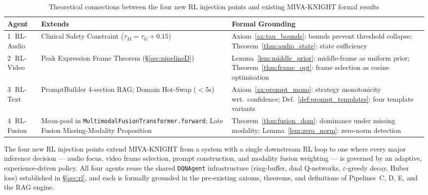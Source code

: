 \documentclass[12pt,a4paper]{article}
\theoremstyle{definition}
\theoremstyle{plain}
\theoremstyle{remark}
\begin{document}
\begin{table}[H]
\centering
\caption{Theoretical connections between the four new RL injection points and
existing MIVA-KNIGHT formal results}
\label{tab:rl_theory}
\begin{tabularx}{\textwidth}{lXX}
\toprule
\textbf{Agent} & \textbf{Extends} & \textbf{Formal Grounding} \\
\midrule
\textcircled{1} RL-Audio &
  Clinical Safety Constraint ($\tau_M = \tau_G + 0.15$) &
  Axiom~\ref{ax:tau_bounds}: bounds prevent threshold collapse;
  Theorem~\ref{thm:audio_state}: state sufficiency \\
\textcircled{2} RL-Video &
  Peak Expression Frame Theorem (\S\ref{sec:pipelineD}) &
  Lemma~\ref{lem:middle_prior}: middle-frame as uniform prior;
  Theorem~\ref{thm:frame_opt}: frame selection as cosine optimisation \\
\textcircled{3} RL-Text &
  PromptBuilder 4-section RAG; Domain Hot-Swap ($<$5s) &
  Axiom~\ref{ax:prompt_mono}: strategy monotonicity wrt.\ confidence;
  Def.~\ref{def:prompt_templates}: four template variants \\
\textcircled{4} RL-Fusion &
  Mean-pool in \texttt{MultimodalFusionTransformer.forward};
  Late Fusion Missing-Modality Proposition &
  Theorem~\ref{thm:fusion_dom}: dominance under missing modality;
  Lemma~\ref{lem:zero_norm}: zero-norm detection \\
\bottomrule
\end{tabularx}
\end{table}

\begin{tcolorbox}[keybox,title={Updated Conclusion Item 8 --- Four Modality-Wide RL Policies}]
The four new RL injection points extend MIVA-KNIGHT from a system with a
single downstream RL loop to one where every major inference decision ---
audio focus, video frame selection, prompt construction, and modality
fusion weighting --- is governed by an adaptive, experience-driven policy.
All four agents reuse the shared \texttt{DQNAgent} infrastructure (ring-buffer,
dual Q-networks, $\varepsilon$-greedy decay, Huber loss) established in
\S\ref{sec:rl}, and each is formally grounded in the pre-existing
axioms, theorems, and definitions of Pipelines~C, D, E, and the RAG engine.
\end{tcolorbox}


\end{document}
